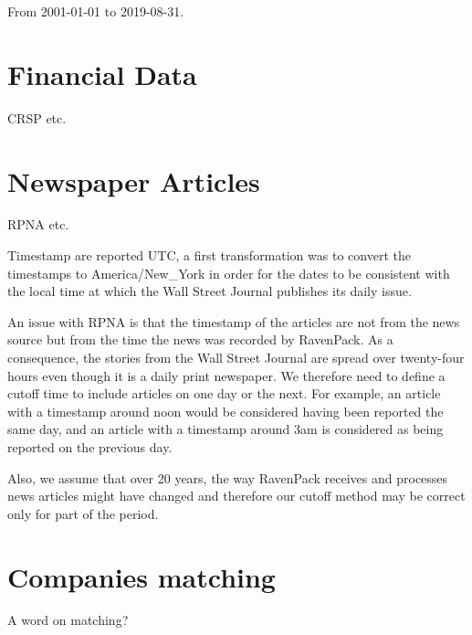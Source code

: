 From 2001-01-01 to 2019-08-31.

\section{Financial Data}
CRSP etc.

\section{Newspaper Articles}
RPNA etc.

Timestamp are reported UTC, a first transformation was to convert the timestamps to America/New\_York in order for the dates to be consistent with the local time at which the Wall Street Journal publishes its daily issue.

An issue with RPNA is that the timestamp of the articles are not from the news source but from the time the news was recorded by RavenPack. As a consequence, the stories from the Wall Street Journal are spread over twenty-four hours even though it is a daily print newspaper. We therefore need to define a cutoff time to include articles on one day or the next. For example, an article with a timestamp around noon would be considered having been reported the same day, and an article with a timestamp around 3am is considered as being reported on the previous day.

Also, we assume that over 20 years, the way RavenPack receives and processes news articles might have changed and therefore our cutoff method may be correct only for part of the period.


\section{Companies matching}
A word on matching?